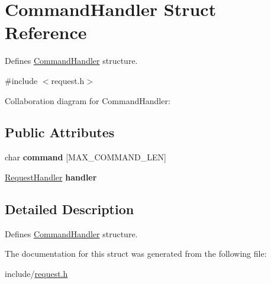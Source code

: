 \hypertarget{structCommandHandler}{}\section{Command\+Handler Struct Reference}
\label{structCommandHandler}


Defines \hyperlink{structCommandHandler}{Command\+Handler} structure.  




{\ttfamily \#include $<$request.\+h$>$}



Collaboration diagram for Command\+Handler\+:
\subsection*{Public Attributes}
\begin{DoxyCompactItemize}
\item 
char {\bfseries command} \mbox{[}M\+A\+X\+\_\+\+C\+O\+M\+M\+A\+N\+D\+\_\+\+L\+EN\mbox{]}\hypertarget{structCommandHandler_aae2a4fb2c875bbf2f160d5f2baed8b5e}{}\label{structCommandHandler_aae2a4fb2c875bbf2f160d5f2baed8b5e}

\item 
\hyperlink{request_8h_a18cbec46cf3788fbea4190f23daad77f}{Request\+Handler} {\bfseries handler}\hypertarget{structCommandHandler_a8c8bd285803a8102baf06c76c310e107}{}\label{structCommandHandler_a8c8bd285803a8102baf06c76c310e107}

\end{DoxyCompactItemize}


\subsection{Detailed Description}
Defines \hyperlink{structCommandHandler}{Command\+Handler} structure. 

The documentation for this struct was generated from the following file\+:\begin{DoxyCompactItemize}
\item 
include/\hyperlink{request_8h}{request.\+h}\end{DoxyCompactItemize}
